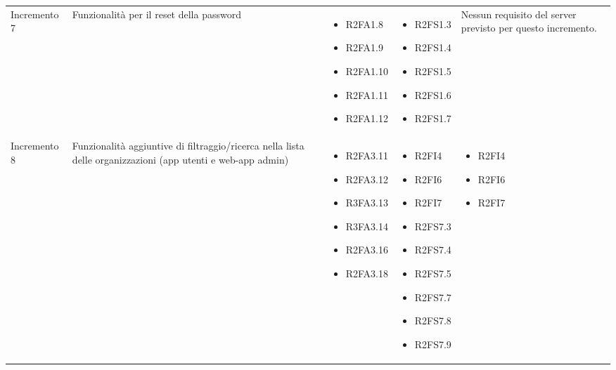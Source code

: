 {\begin{longtable}{C{2.5cm} C{3.2cm} C{2.8cm} C{2.8cm} C{2.8cm}}
Incremento 7 & Funzionalità per il reset della password & \begin{itemize}
    \item[ ] R2FA1.8
    \item[ ] R2FA1.9
    \item[ ] R2FA1.10
    \item[ ] R2FA1.11
    \item[ ] R2FA1.12
\end{itemize} & \begin{itemize} 
    \item[ ] R2FS1.3 %
    \item[ ] R2FS1.4 %
    \item[ ] R2FS1.5 %
    \item[ ] R2FS1.6 %
    \item[ ] R2FS1.7 %
\end{itemize} & 
    Nessun requisito del server previsto per questo incremento. \\

Incremento 8 & Funzionalità aggiuntive di filtraggio/ricerca nella lista delle organizzazioni (app utenti e web-app admin) & \begin{itemize}
    \item[ ] R2FA3.11
    \item[ ] R2FA3.12
    \item[ ] R3FA3.13
    \item[ ] R3FA3.14
    \item[ ] R2FA3.16
    \item[ ] R2FA3.18
\end{itemize} & \begin{itemize} 
    \item[ ] R2FI4
    \item[ ] R2FI6
    \item[ ] R2FI7
    \item[ ] R2FS7.3
    \item[ ] R2FS7.4
    \item[ ] R2FS7.5
    \item[ ] R2FS7.7 %
    \item[ ] R2FS7.8 %
    \item[ ] R2FS7.9 %
\end{itemize} & \begin{itemize} 
    \item[ ] R2FI4
    \item[ ] R2FI6
    \item[ ] R2FI7
\end{itemize}\\


\end{longtable}}
